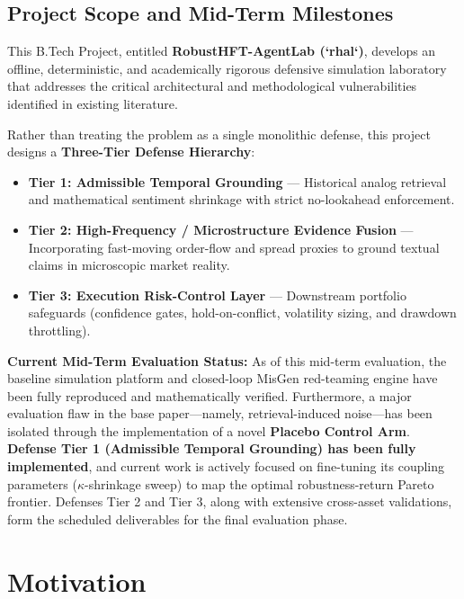 \documentclass[11pt,a4paper]{article}
\begin{document}
\subsection{Project Scope and Mid-Term Milestones}
This B.Tech Project, entitled \textbf{RobustHFT-AgentLab (`rhal`)}, develops an offline, deterministic, and academically rigorous defensive simulation laboratory that addresses the critical architectural and methodological vulnerabilities identified in existing literature. 

Rather than treating the problem as a single monolithic defense, this project designs a \textbf{Three-Tier Defense Hierarchy}:
\begin{itemize}
    \item \textbf{Tier 1: Admissible Temporal Grounding} — Historical analog retrieval and mathematical sentiment shrinkage with strict no-lookahead enforcement.
    \item \textbf{Tier 2: High-Frequency / Microstructure Evidence Fusion} — Incorporating fast-moving order-flow and spread proxies to ground textual claims in microscopic market reality.
    \item \textbf{Tier 3: Execution Risk-Control Layer} — Downstream portfolio safeguards (confidence gates, hold-on-conflict, volatility sizing, and drawdown throttling).
\end{itemize}

\textbf{Current Mid-Term Evaluation Status:} As of this mid-term evaluation, the baseline simulation platform and closed-loop MisGen red-teaming engine have been fully reproduced and mathematically verified. Furthermore, a major evaluation flaw in the base paper—namely, retrieval-induced noise—has been isolated through the implementation of a novel \textbf{Placebo Control Arm}. \textbf{Defense Tier 1 (Admissible Temporal Grounding) has been fully implemented}, and current work is actively focused on fine-tuning its coupling parameters ($\kappa$-shrinkage sweep) to map the optimal robustness-return Pareto frontier. Defenses Tier 2 and Tier 3, along with extensive cross-asset validations, form the scheduled deliverables for the final evaluation phase.

\section{Motivation}
\label{sec:motivation}
\end{document}
